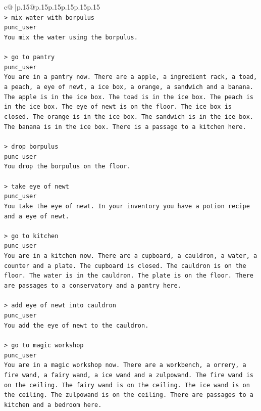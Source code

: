 \documentclass{article}
\begin{document}
{\begin{supertabular}{c@{$\;$}|p{.15\linewidth}@{}p{.15\linewidth}p{.15\linewidth}p{.15\linewidth}p{.15\linewidth}p{.15\linewidth}}
{{{\\ 
\texttt{> mix water with borpulus} \\
\texttt{punc\_user} \\
\texttt{You mix the water using the borpulus.} \\
\\ 
\texttt{> go to pantry} \\
\texttt{punc\_user} \\
\texttt{You are in a pantry now. There are a apple, a ingredient rack, a toad, a peach, a eye of newt, a ice box, a orange, a sandwich and a banana. The apple is in the ice box. The toad is in the ice box. The peach is in the ice box. The eye of newt is on the floor. The ice box is closed. The orange is in the ice box. The sandwich is in the ice box. The banana is in the ice box. There is a passage to a kitchen here.} \\
\\ 
\texttt{> drop borpulus} \\
\texttt{punc\_user} \\
\texttt{You drop the borpulus on the floor.} \\
\\ 
\texttt{> take eye of newt} \\
\texttt{punc\_user} \\
\texttt{You take the eye of newt. In your inventory you have a potion recipe and a eye of newt.} \\
\\ 
\texttt{> go to kitchen} \\
\texttt{punc\_user} \\
\texttt{You are in a kitchen now. There are a cupboard, a cauldron, a water, a counter and a plate. The cupboard is closed. The cauldron is on the floor. The water is in the cauldron. The plate is on the floor. There are passages to a conservatory and a pantry here.} \\
\\ 
\texttt{> add eye of newt into cauldron} \\
\texttt{punc\_user} \\
\texttt{You add the eye of newt to the cauldron.} \\
\\ 
\texttt{> go to magic workshop} \\
\texttt{punc\_user} \\
\texttt{You are in a magic workshop now. There are a workbench, a orrery, a fire wand, a fairy wand, a ice wand and a zulpowand. The fire wand is on the ceiling. The fairy wand is on the ceiling. The ice wand is on the ceiling. The zulpowand is on the ceiling. There are passages to a kitchen and a bedroom here.} \\
}}}
\end{supertabular}}
\end{document}
